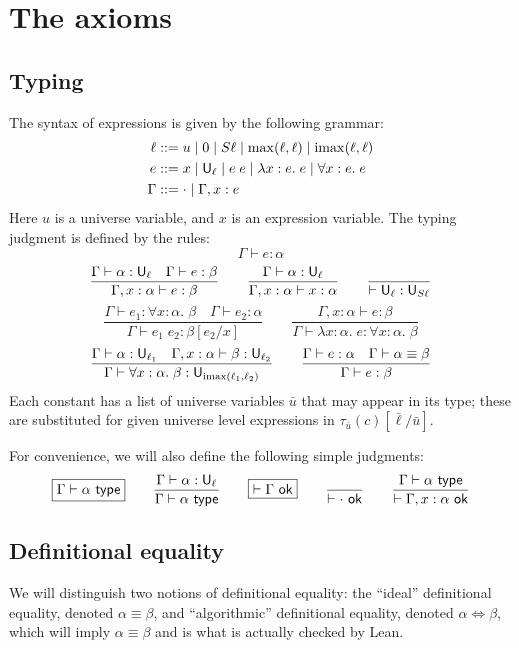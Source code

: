 \section{The axioms}\label{sec:axioms}

\subsection{Typing}

The syntax of expressions is given by the following grammar:
\begin{align*}
\ell&::=u\mid 0\mid S\ell\mid \max(\ell,\ell)\mid \imax(\ell,\ell)\\
e&::=x\mid \U_\ell\mid e\;e\mid \lambda x:e.\;e\mid \forall x:e.\;e\\
\Gamma&::=\cdot\mid \Gamma,x:e
\end{align*}
Here $u$ is a universe variable, and $x$ is an expression variable. The typing judgment is defined by the rules:
$$\boxed{\Gamma\vdash e:\alpha}$$
$$\frac{\Gamma\vdash \alpha:\U_\ell\quad \Gamma\vdash e:\beta}{\Gamma,x:\alpha\vdash e:\beta}\qquad
\frac{\Gamma\vdash \alpha:\U_\ell}{\Gamma,x:\alpha\vdash x:\alpha}\qquad
\frac{}{\vdash\U_\ell:\U_{S\ell}}$$
$$\frac{\Gamma\vdash e_1:\forall x:\alpha.\;\beta\quad\Gamma\vdash e_2:\alpha}{\Gamma\vdash e_1\;e_2:\beta[e_2/x]}\qquad
\frac{\Gamma,x:\alpha\vdash e:\beta}{\Gamma\vdash\lambda x:\alpha.\;e:\forall x:\alpha.\;\beta}$$
$$\frac{\Gamma\vdash\alpha:\U_{\ell_1}\quad\Gamma,x:\alpha\vdash \beta:\U_{\ell_2}}{\Gamma\vdash\forall x:\alpha.\;\beta:\U_{\imax(\ell_1,\ell_2)}}\qquad
\frac{\Gamma\vdash e:\alpha\quad \Gamma\vdash\alpha\equiv\beta}{\Gamma\vdash e:\beta}$$
Each constant has a list of universe variables $\bar u$ that may appear in its type; these are substituted for given universe level expressions in $\tau_{\bar u}(c)[\bar\ell/\bar u]$.

For convenience, we will also define the following simple judgments:
$$\boxed{\Gamma\vdash\alpha\type}\qquad
\frac{\Gamma\vdash\alpha:\U_\ell}{\Gamma\vdash\alpha\type}\qquad
\boxed{\vdash\Gamma\ok}\qquad\frac{}{\vdash \cdot\ok}\qquad\frac{\Gamma\vdash\alpha\type}{\vdash \Gamma,x:\alpha\ok}$$
\subsection{Definitional equality}

We will distinguish two notions of definitional equality: the ``ideal'' definitional equality, denoted $\alpha\equiv\beta$, and ``algorithmic'' definitional equality, denoted $\alpha\Leftrightarrow\beta$, which will imply $\alpha\equiv\beta$ and is what is actually checked by Lean.

